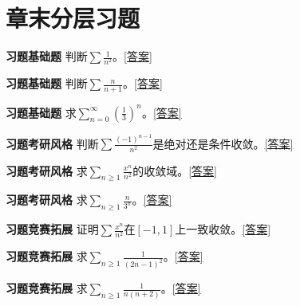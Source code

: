 














\section*{章末分层习题}
\label{q:9:1}\par\noindent\textbf{习题\theexercise\quad 基础题} 判断$\sum\frac{1}{n^2}$。\quad\hyperref[a:9:1]{[答案]}\par
{}\label{q:9:2}\par\noindent\textbf{习题\theexercise\quad 基础题} 判断$\sum \frac{n}{n+1}$。\quad\hyperref[a:9:2]{[答案]}\par
{}\label{q:9:3}\par\noindent\textbf{习题\theexercise\quad 基础题} 求$\sum_{n=0}^{\infty}(\frac{1}{3})^n$。\quad\hyperref[a:9:3]{[答案]}\par
{}\label{q:9:4}\par\noindent\textbf{习题\theexercise\quad 考研风格} 判断$\sum\frac{(-1)^{n-1}}{n^2}$是绝对还是条件收敛。\quad\hyperref[a:9:4]{[答案]}\par
{}\label{q:9:5}\par\noindent\textbf{习题\theexercise\quad 考研风格} 求$\sum_{n\ge1}\frac{x^n}{n^2}$的收敛域。\quad\hyperref[a:9:5]{[答案]}\par
{}\label{q:9:6}\par\noindent\textbf{习题\theexercise\quad 考研风格} 求$\sum_{n\ge1}\frac{n}{3^n}$。\quad\hyperref[a:9:6]{[答案]}\par
{}\label{q:9:7}\par\noindent\textbf{习题\theexercise\quad 竞赛拓展} 证明$\sum \frac{x^n}{n^2}$在$[-1,1]$上一致收敛。\quad\hyperref[a:9:7]{[答案]}\par
{}\label{q:9:8}\par\noindent\textbf{习题\theexercise\quad 竞赛拓展} 求$\sum_{n\ge1}\frac{1}{(2n-1)^2}$。\quad\hyperref[a:9:8]{[答案]}\par
{}\label{q:9:9}\par\noindent\textbf{习题\theexercise\quad 竞赛拓展} 求$\sum_{n\ge1}\frac{1}{n(n+2)}$。\quad\hyperref[a:9:9]{[答案]}\par
